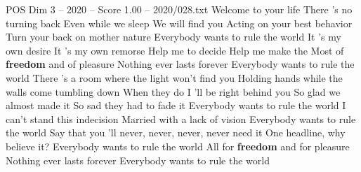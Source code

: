 \begin{textsample}{POS Dim 3 – 2020 – Score 1.00 – 2020/028.txt}  \label{ex:f3_pos_011}
Welcome to your life There 's no turning back Even while we sleep We will find you Acting on your best behavior Turn your back on mother nature Everybody wants to rule the world It 's my own desire It 's my own remorse Help me to decide Help me make the Most of \textbf{freedom} and of pleasure Nothing ever lasts forever Everybody wants to rule the world There 's a room where the light won't find you Holding hands while the walls come tumbling down When they do I 'll be right behind you So glad we almost made it So sad they had to fade it Everybody wants to rule the world I can't stand this indecision Married with a lack of vision Everybody wants to rule the world Say that you 'll never, never, never, never need it One headline, why believe it?
Everybody wants to rule the world All for \textbf{freedom} and for pleasure Nothing ever lasts forever Everybody wants to rule the world

\end{textsample}
